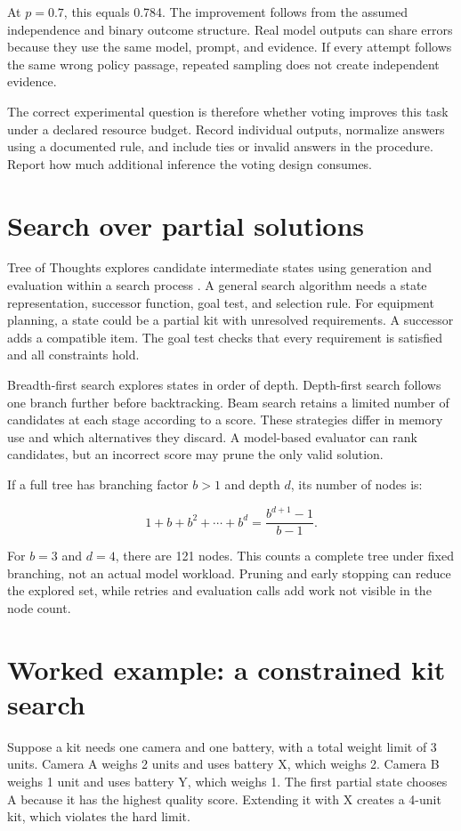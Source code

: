 At \(p=0.7\), this equals 0.784. The improvement follows from the assumed independence and binary outcome structure. Real model outputs can share errors because they use the same model, prompt, and evidence. If every attempt follows the same wrong policy passage, repeated sampling does not create independent evidence.

The correct experimental question is therefore whether voting improves this task under a declared resource budget. Record individual outputs, normalize answers using a documented rule, and include ties or invalid answers in the procedure. Report how much additional inference the voting design consumes.

\section{Search over partial solutions}
Tree of Thoughts explores candidate intermediate states using generation and evaluation within a search process \cite{tree-thoughts}. A general search algorithm needs a state representation, successor function, goal test, and selection rule. For equipment planning, a state could be a partial kit with unresolved requirements. A successor adds a compatible item. The goal test checks that every requirement is satisfied and all constraints hold.

Breadth-first search explores states in order of depth. Depth-first search follows one branch further before backtracking. Beam search retains a limited number of candidates at each stage according to a score. These strategies differ in memory use and which alternatives they discard. A model-based evaluator can rank candidates, but an incorrect score may prune the only valid solution.

If a full tree has branching factor \(b>1\) and depth \(d\), its number of nodes is:

\begin{equation}
1+b+b^2+\cdots+b^d=\frac{b^{d+1}-1}{b-1}.
\end{equation}

For \(b=3\) and \(d=4\), there are 121 nodes. This counts a complete tree under fixed branching, not an actual model workload. Pruning and early stopping can reduce the explored set, while retries and evaluation calls add work not visible in the node count.

\section{Worked example: a constrained kit search}
Suppose a kit needs one camera and one battery, with a total weight limit of 3 units. Camera A weighs 2 units and uses battery X, which weighs 2. Camera B weighs 1 unit and uses battery Y, which weighs 1. The first partial state chooses A because it has the highest quality score. Extending it with X creates a 4-unit kit, which violates the hard limit.

